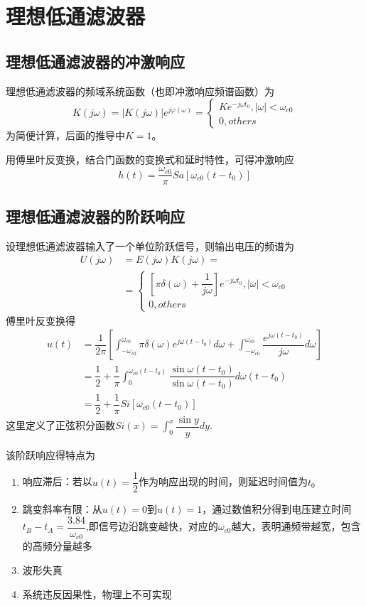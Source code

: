 \section{理想低通滤波器}
\subsection{理想低通滤波器的冲激响应}
理想低通滤波器的频域系统函数（也即冲激响应频谱函数）为
\begin{equation}
    K(j\omega)=|K(j\omega)|e^{j\varphi(\omega)}=
    \begin{cases}
        K e^{-j\omega t_0},|\omega|<\omega_{c0}\\
        0,others
    \end{cases}
\end{equation}
为简便计算，后面的推导中$K=1$。

用傅里叶反变换，结合门函数的变换式和延时特性，可得冲激响应
\begin{equation}
    h(t)=\dfrac{\omega_{c0}}{\pi}Sa[\omega_{c0}(t-t_0)]
\end{equation}
\subsection{理想低通滤波器的阶跃响应}
设理想低通滤波器输入了一个单位阶跃信号，则输出电压的频谱为
\begin{align}
    U(j\omega)&=E(j\omega)K(j\omega)=\\
    &=\begin{cases}
        \left[ \pi \delta(\omega)+\dfrac{1}{j\omega} \right]e^{-j\omega t_0},|\omega|<\omega_{c0}\\
        0,others
    \end{cases}
\end{align}
傅里叶反变换得
\begin{align}
    u(t)&=\dfrac{1}{2\pi}\left[ \int_{-\omega_{c0}}^{\omega_{c0}} \pi \delta(\omega)e^{j\omega(t-t_0)}d\omega + \int_{-\omega_{c0}}^{\omega_{c0}} \dfrac{e^{j\omega(t-t_0)}}{j\omega}d\omega \right]\\
&=\dfrac{1}{2}+\dfrac{1}{\pi}\int_0^{\omega_{c0}(t-t_0)}\dfrac{\sin \omega(t-t_0)}{\sin \omega(t-t_0)}d\omega (t-t_0)\\
&=\dfrac{1}{2}+\dfrac{1}{\pi}Si[\omega_{c0}(t-t_0)]
\end{align}
这里定义了正弦积分函数$Si(x)=\int_0^x \dfrac{\sin y}{y}dy$.

该阶跃响应得特点为
\begin{enumerate}
    \item 响应滞后：若以$u(t)=\dfrac{1}{2}$作为响应出现的时间，则延迟时间值为$t_0$
    \item 跳变斜率有限：从$u(t)=0$到$u(t)=1$，通过数值积分得到电压建立时间$t_B-t_A=\dfrac{3.84}{\omega_{c0}}$,即信号边沿跳变越快，对应的$\omega_{c0}$越大，表明通频带越宽，包含的高频分量越多
    \item 波形失真
    \item 系统违反因果性，物理上不可实现
\end{enumerate}
